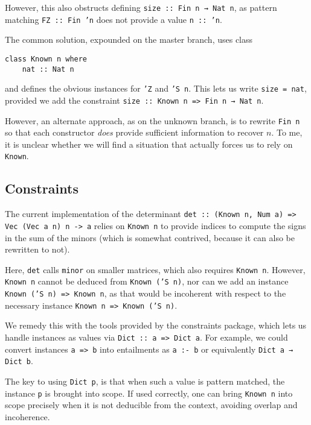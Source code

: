 \documentclass{article}
\begin{document}
    However, this also obstructs defining \texttt{size :: Fin n → Nat n},
    as pattern matching \texttt{FZ :: Fin 'n} does not provide a value \texttt{n :: 'n}.

    The common solution, expounded on the master branch, uses class
\begin{verbatim}
class Known n where
    nat :: Nat n
\end{verbatim}
    and defines the obvious instances for \texttt{'Z} and \texttt{'S n}.
    This lets us write \texttt{size = nat}, provided we add the constraint \texttt{size :: Known n => Fin n → Nat n}.

    However, an alternate approach, as on the unknown branch, is to rewrite \texttt{Fin n} so that each constructor \textit{does} provide sufficient information to recover $n$.
    To me, it is unclear whether we will find a situation that actually forces us to rely on \texttt{Known}.

    \subsection{Constraints}
    The current implementation of the determinant \texttt{det :: (Known n, Num a) => Vec (Vec a n) n -> a} relies on \texttt{Known n} to provide indices to compute the signs in the sum of the minors (which is somewhat contrived, because it can also be rewritten to not).

    Here, \texttt{det} calls \texttt{minor} on smaller matrices, which also requires \texttt{Known n}.
    However, \texttt{Known n} cannot be deduced from \texttt{Known ('S n)}, nor can we add an instance \texttt{Known ('S n) => Known n}, as that would be incoherent with respect to the necessary instance \texttt{Known n => Known ('S n)}. 

    We remedy this with the tools provided by the constraints package,
    which lets us handle instances as values via \texttt{Dict :: a => Dict a}.
    For example, we could convert instances \texttt{a => b} into entailments as \texttt{a :- b} or equivalently \texttt{Dict a → Dict b}.

    The key to using \texttt{Dict p}, is that when such a value is pattern matched, the instance \texttt{p} is brought into scope.
    If used correctly, one can bring \texttt{Known n} into scope precisely when it is not deducible from the context,
    avoiding overlap and incoherence. 
\end{document}

